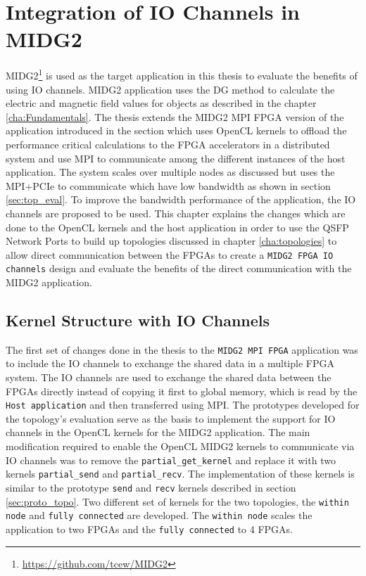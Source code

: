 \chapter{Integration of IO Channels in MIDG2}
\label{cha:sys_arch}

MIDG2\footnote{\url{https://github.com/tcew/MIDG2}} is used as the target
application in this thesis to evaluate the benefits of using IO channels.
MIDG2 application uses the \ac{DG} method to calculate the electric and magnetic
field values for objects as described in the chapter \ref{cha:Fundamentals}.
The thesis extends the MIDG2 \ac{MPI} FPGA version of the application introduced in the
section \label{sec:midge_mpi} which uses OpenCL kernels to
offload the performance critical calculations to the FPGA accelerators in a
distributed system and use MPI to communicate among the different instances of the
host application. The system scales over multiple nodes as discussed but
uses the \ac{MPI}+PCIe to communicate which have low bandwidth as shown in section
\ref{sec:top_eval}. To improve the bandwidth performance of the application,
the IO channels are proposed to be used. This chapter explains the changes
which are done to the OpenCL kernels and the host application in order to use
the QSFP Network Ports to build up topologies discussed in chapter
\ref{cha:topologies} to allow direct communication between the FPGAs to create a
\texttt{MIDG2 FPGA IO channels} design
and evaluate the benefits of the direct communication with the MIDG2 application.

\section{Kernel Structure with IO Channels}
\label{sec:struc_iochan}

The first set of changes done in the thesis to the \texttt{MIDG2 MPI FPGA} application
was to include the IO channels to exchange the shared data in a multiple FPGA system.
The IO channels are used to exchange the shared data between the FPGAs directly instead
of copying it first to global memory, which is read by the \texttt{Host application}
and then transferred using MPI. The prototypes developed for the topology's evaluation
serve as the basis to implement the support for IO channels in the OpenCL kernels for
the MIDG2 application. The main modification required to enable the OpenCL MIDG2
kernels to communicate via IO channels
was to remove the \texttt{partial\_get\_kernel} and replace it with two kernels
\texttt{partial\_send} and \texttt{partial\_recv}. The implementation of these kernels
is similar to the prototype \texttt{send} and \texttt{recv} kernels described in
section \ref{sec:proto_topo}. Two different set of kernels for the two topologies,
the \texttt{within node} and \texttt{fully connected} are developed. The \texttt{within node}
scales the application to two FPGAs and the \texttt{fully connected} to 4 FPGAs.

